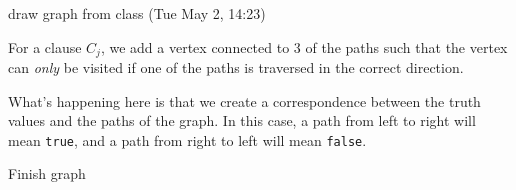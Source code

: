 \documentclass[12pt]{article}
\begin{document}
{    \TODO{} draw graph from class (Tue May 2, 14:23)

    For a clause $C_j$, we add a vertex connected to 3 of the paths such that
    the vertex can {\it only} be visited if one of the paths is traversed in the
    correct direction.

    What's happening here is that we create a correspondence between the truth
    values and the paths of the graph. In this case, a path from left to right
    will mean \texttt{true}, and a path from right to left will mean
    \texttt{false}.


    \TODO{} Finish graph
    \begin{center}
\end{center}}
\end{document}
